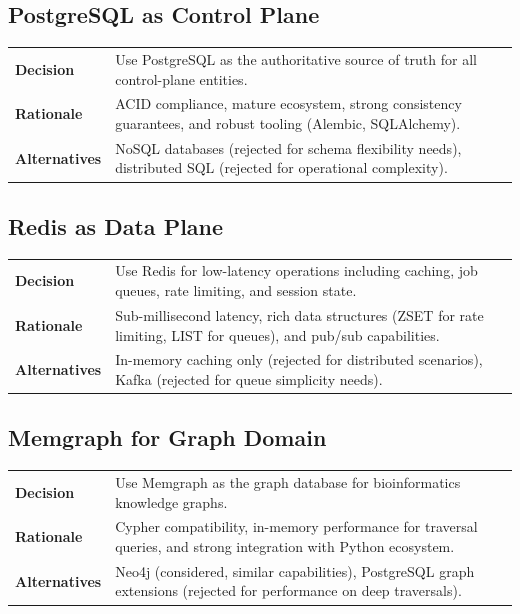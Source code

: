 \subsection{PostgreSQL as Control Plane}

\begin{table}[ht]
\centering
\small
\begin{tabularx}{\textwidth}{lX}
    \hline
    \textbf{Decision} & Use PostgreSQL as the authoritative source of truth for all control-plane entities. \\
    \textbf{Rationale} & ACID compliance, mature ecosystem, strong consistency guarantees, and robust tooling (Alembic, SQLAlchemy). \\
    \textbf{Alternatives} & NoSQL databases (rejected for schema flexibility needs), distributed SQL (rejected for operational complexity). \\
    \hline
\end{tabularx}
\end{table}

\subsection{Redis as Data Plane}

\begin{table}[ht]
\centering
\small
\begin{tabularx}{\textwidth}{lX}
    \hline
    \textbf{Decision} & Use Redis for low-latency operations including caching, job queues, rate limiting, and session state. \\
    \textbf{Rationale} & Sub-millisecond latency, rich data structures (ZSET for rate limiting, LIST for queues), and pub/sub capabilities. \\
    \textbf{Alternatives} & In-memory caching only (rejected for distributed scenarios), Kafka (rejected for queue simplicity needs). \\
    \hline
\end{tabularx}
\end{table}

\subsection{Memgraph for Graph Domain}

\begin{table}[ht]
\centering
\small
\begin{tabularx}{\textwidth}{lX}
    \hline
    \textbf{Decision} & Use Memgraph as the graph database for bioinformatics knowledge graphs. \\
    \textbf{Rationale} & Cypher compatibility, in-memory performance for traversal queries, and strong integration with Python ecosystem. \\
    \textbf{Alternatives} & Neo4j (considered, similar capabilities), PostgreSQL graph extensions (rejected for performance on deep traversals). \\
    \hline
\end{tabularx}
\end{table}

